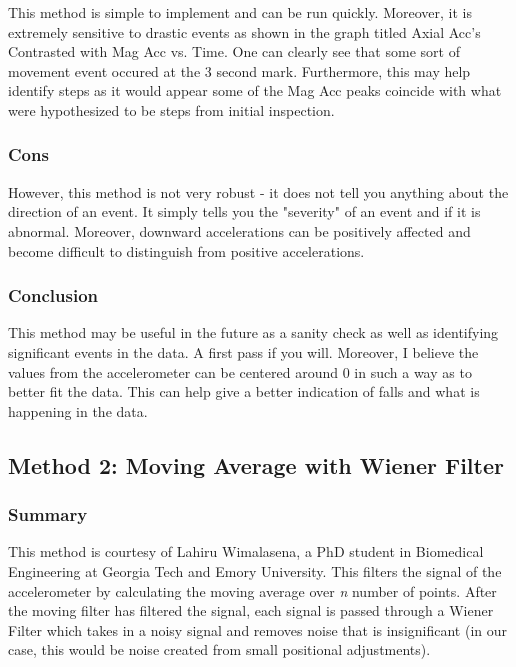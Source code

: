 \documentclass[11pt]{article}
\begin{document}
This method is simple to implement and can be run quickly. Moreover, it
is extremely sensitive to drastic events as shown in the graph titled
Axial Acc's Contrasted with Mag Acc vs. Time. One can clearly see that
some sort of movement event occured at the 3 second mark. Furthermore,
this may help identify steps as it would appear some of the Mag Acc
peaks coincide with what were hypothesized to be steps from initial
inspection.

\subsubsection{\texorpdfstring{\textbf{Cons}}{Cons}}\label{cons}

However, this method is not very robust - it does not tell you anything
about the direction of an event. It simply tells you the "severity" of
an event and if it is abnormal. Moreover, downward accelerations can be
positively affected and become difficult to distinguish from positive
accelerations.

\subsubsection{\texorpdfstring{\textbf{Conclusion}}{Conclusion}}\label{conclusion}

This method may be useful in the future as a sanity check as well as
identifying significant events in the data. A first pass if you will.
Moreover, I believe the values from the accelerometer can be centered
around 0 in such a way as to better fit the data. This can help give a
better indication of falls and what is happening in the data.

    \subsection{\texorpdfstring{\textbf{Method 2: Moving Average with Wiener
Filter}}{Method 2: Moving Average with Wiener Filter}}\label{method-2-moving-average-with-wiener-filter}

\subsubsection{\texorpdfstring{\textbf{Summary}}{Summary}}\label{summary}

This method is courtesy of Lahiru Wimalasena, a PhD student in
Biomedical Engineering at Georgia Tech and Emory University. This
filters the signal of the accelerometer by calculating the moving
average over \emph{n} number of points. After the moving filter has
filtered the signal, each signal is passed through a Wiener Filter which
takes in a noisy signal and removes noise that is insignificant (in our
case, this would be noise created from small positional adjustments).
\end{document}
